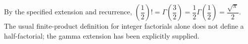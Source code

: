 By the specified extension and recurrence, $\left(\dfrac{1}{2}\right)!=\Gamma\left(\dfrac{3}{2}\right)=\dfrac{1}{2}\Gamma\left(\dfrac{1}{2}\right)=\boxed{\dfrac{\sqrt\pi}{2}}$. The usual finite-product definition for integer factorials alone does not define a half-factorial; the gamma extension has been explicitly supplied.
